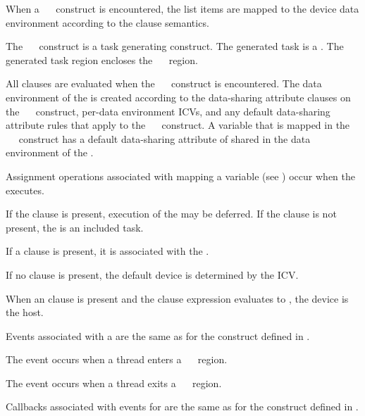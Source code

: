 \descr
When a ~~ construct is encountered, the 
list items are mapped to the device data environment according to the  
clause semantics.

The ~~ construct is a task generating 
construct.  The generated task is a .  The generated task 
region encloses the ~~ region.

All clauses are evaluated when the ~~ 
construct is encountered.  The data environment of the  
is created according to the data-sharing attribute clauses on the 
~~ construct, per-data environment ICVs, 
and any default data-sharing attribute rules that apply to the 
~~ construct.  A variable that is 
mapped in the ~~ construct has a 
default data-sharing attribute of shared in the data environment of 
the .

Assignment operations associated with mapping a variable (see 
) occur when the  executes.

If the  clause is present, execution of the  
may be deferred.  If the  clause is not present, the 
 is an included task.

If a  clause is present, it is associated with the .

If no  clause is present, the default device is determined by the 
 ICV.

When an  clause is present and the  clause expression 
evaluates to , the device is the host.

\events

Events associated with a  are the same as for the  
construct defined in .

The  event occurs when a thread enters a
~~ region.

The  event occurs when a thread exits a
~~ region.

\tools
Callbacks associated with events for  are the same as 
for the  construct defined in .

